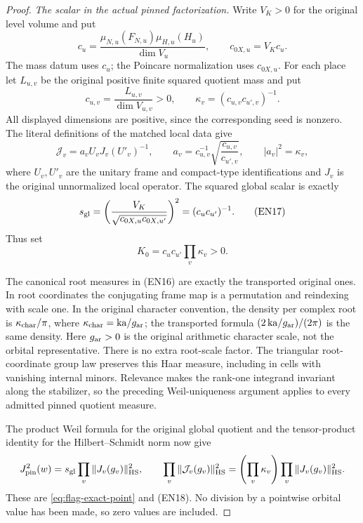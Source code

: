 \begin{proof}
\emph{The scalar in the actual pinned factorization.}
Write \(V_K>0\) for the original level volume and put
\[
 c_u=\frac{\mu_{N,u}(F_{N,u})\mu_{H,u}(H_u)}
                              {\dim V_u},
 \qquad c_{0X,u}=V_Kc_u .
                                                        \tag{EN14}
\]
The mass datum uses \(c_u\); the Poincare normalization
uses \(c_{0X,u}\). For each place let \(L_{u,v}\) be the
original positive finite squared quotient mass and put
\[
 c_{u,v}=\frac{L_{u,v}}{\dim V_{u,v}}>0,\qquad
 \kappa_v=(c_{u,v}c_{u',v})^{-1}.
                                                        \tag{EN15}
\]
All displayed dimensions are positive, since the
corresponding seed is nonzero. The literal definitions
of the matched local data give
\[
 \mathcal J_v
       =a_vU_vJ_v(U'_v)^{-1},\qquad
 a_v=c_{u,v}^{-1}\sqrt{\frac{c_{u,v}}{c_{u',v}}},
 \qquad |a_v|^2=\kappa_v ,
                                                        \tag{EN16}
\]
where \(U_v,U'_v\) are the unitary frame and compact-type
identifications and \(J_v\) is the original unnormalized
local operator. The squared global scalar is exactly
\[
 s_{\rm gl}
       =\left(\frac{V_K}{\sqrt{c_{0X,u}c_{0X,u'}}}\right)^2
       =(c_uc_{u'})^{-1}.
                                                        \tag{EN17}
\]
Thus set
\[
             K_0=c_uc_{u'}\prod_v\kappa_v>0 .
                                                        \tag{EN18}
\]

The canonical root measures in (EN16) are exactly the
transported original ones. In root coordinates the
conjugating frame map is a permutation and reindexing
with scale one. In the original character convention,
the density per complex root is
\(\kappa_{\rm char}/\pi\), where
\(\kappa_{\rm char}=\mathrm{ka}/g_{\rm ar}\);
the transported formula
\((2\,\mathrm{ka}/g_{\rm ar})/(2\pi)\) is the same
density. Here \(g_{\rm ar}>0\) is the original
arithmetic character scale, not the orbital
representative. There is no extra root-scale factor.
The triangular root-coordinate group law preserves
this Haar measure, including in cells with vanishing
internal minors. Relevance makes the rank-one
integrand invariant along the stabilizer, so the
preceding Weil-uniqueness argument applies to every
admitted pinned quotient measure.

The product Weil formula for the original global
quotient and the tensor-product identity for the
Hilbert--Schmidt norm now give
\[
 J_{\rm pin}^2(w)=s_{\rm gl}\prod_v\|J_v(g_v)\|_{\rm HS}^2,
 \qquad
 \prod_v\|\mathcal J_v(g_v)\|_{\rm HS}^2
             =\left(\prod_v\kappa_v\right)
                         \prod_v\|J_v(g_v)\|_{\rm HS}^2 .
\]
These are \eqref{eq:flag-exact-point} and (EN18).
No division by a pointwise orbital value has been
made, so zero values are included.


\end{proof}
